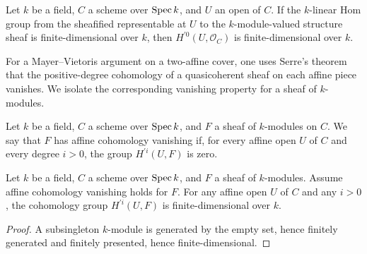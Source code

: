 \begin{theorem}\label{mk-thm:Scheme_module_finite_HModule_prime_zero_curve}
  \leanok

  Let \(k\) be a field, \(C\) a scheme over \(\operatorname{Spec} k\), and \(U\) an open of \(C\). If the \(k\)-linear Hom group from the sheafified representable at \(U\) to the \(k\)-module-valued structure sheaf is finite-dimensional over \(k\), then \(H^{\prime 0}(U, \mathcal O_C)\) is finite-dimensional over \(k\).
\end{theorem}


For a Mayer--Vietoris argument on a two-affine cover, one uses Serre's theorem that the positive-degree cohomology of a quasicoherent sheaf on each affine piece vanishes. We isolate the corresponding vanishing property for a sheaf of \(k\)-modules.

\begin{definition}\label{mk-thm:Scheme_IsAffineHModuleVanishing}
  \leanok

  Let \(k\) be a field, \(C\) a scheme over \(\operatorname{Spec} k\), and \(F\) a sheaf of \(k\)-modules on \(C\). We say that \(F\) has affine cohomology vanishing if, for every affine open \(U\) of \(C\) and every degree \(i > 0\), the group \(H^{\prime i}(U, F)\) is zero.
\end{definition}

\begin{theorem}\label{mk-thm:Scheme_module_finite_HModule_prime_of_isAffineHModuleVanishing}
  \leanok

  Let \(k\) be a field, \(C\) a scheme over \(\operatorname{Spec} k\), and \(F\) a sheaf of \(k\)-modules. Assume affine cohomology vanishing holds for \(F\). For any affine open \(U\) of \(C\) and any \(i > 0\), the cohomology group \(H^{\prime i}(U, F)\) is finite-dimensional over \(k\).
\end{theorem}

\begin{proof}
  \leanok

  A subsingleton \(k\)-module is generated by the empty set, hence finitely generated and finitely presented, hence finite-dimensional.
\end{proof}


